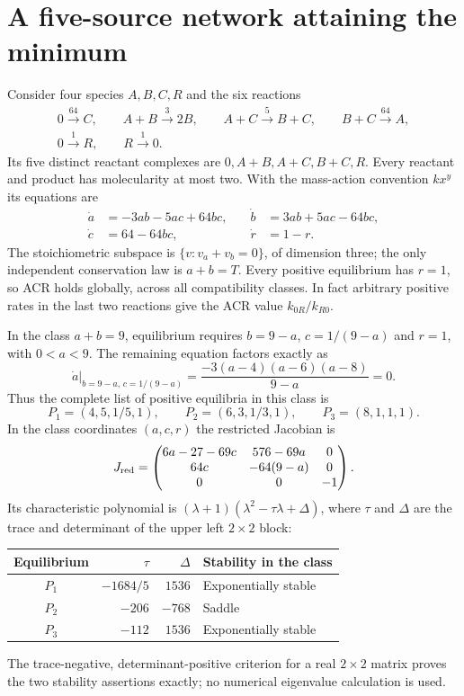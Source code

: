 \documentclass[11pt,a4paper]{report}
\begin{document}
\section{A five-source network attaining the minimum}
Consider four species $A,B,C,R$ and the six reactions
\begin{equation}\label{eq:network}
\begin{gathered}
 0\xrightarrow{64}C,\qquad A+B\xrightarrow{3}2B,\qquad
 A+C\xrightarrow{5}B+C,\qquad B+C\xrightarrow{64}A,\\
 0\xrightarrow{1}R,\qquad R\xrightarrow{1}0.
\end{gathered}
\end{equation}
Its five distinct reactant complexes are $0,A+B,A+C,B+C,R$. Every reactant and product has
molecularity at most two. With the mass-action convention $k x^y$ its equations are
\begin{equation}\label{eq:exampleode}
\begin{aligned}
 \dot a&=-3ab-5ac+64bc, &\quad \dot b&=3ab+5ac-64bc,\\
 \dot c&=64-64bc, &\quad \dot r&=1-r.
\end{aligned}
\end{equation}
The stoichiometric subspace is $\{v:v_a+v_b=0\}$, of dimension three; the only independent
conservation law is $a+b=T$. Every positive equilibrium has $r=1$, so ACR holds globally, across
all compatibility classes. In fact arbitrary positive rates in the last two reactions give the
ACR value $k_{0R}/k_{R0}$.

In the class $a+b=9$, equilibrium requires $b=9-a$, $c=1/(9-a)$ and $r=1$, with $0<a<9$.
The remaining equation factors exactly as
\[
 \dot a\big|_{b=9-a,\,c=1/(9-a)}
 =\frac{-3(a-4)(a-6)(a-8)}{9-a}=0.
\]
Thus the complete list of positive equilibria in this class is
\[
 P_1=(4,5,1/5,1),\qquad P_2=(6,3,1/3,1),\qquad P_3=(8,1,1,1).
\]
In the class coordinates $(a,c,r)$ the restricted Jacobian is
\[
 J_{\rm red}=\begin{pmatrix}
 6a-27-69c&576-69a&0\\
 64c&-64(9-a)&0\\
 0&0&-1
 \end{pmatrix}.
\]
Its characteristic polynomial is $(\lambda+1)(\lambda^2-\tau\lambda+\Delta)$, where
$\tau$ and $\Delta$ are the trace and determinant of the upper left $2\times2$ block:
\begin{center}
\begin{tabular}{crrl}
\toprule
Equilibrium & $\tau$ & $\Delta$ & Stability in the class\\
\midrule
$P_1$ & $-1684/5$ & $1536$ & Exponentially stable\\
$P_2$ & $-206$ & $-768$ & Saddle\\
$P_3$ & $-112$ & $1536$ & Exponentially stable\\
\bottomrule
\end{tabular}
\end{center}
The trace-negative, determinant-positive criterion for a real $2\times2$ matrix proves the two
stability assertions exactly; no numerical eigenvalue calculation is used.
\end{document}
